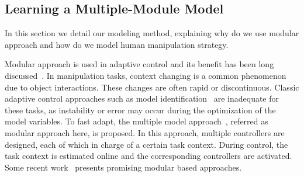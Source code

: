 \subsection{Learning a Multiple-Module Model}
\label{cha4:sec2:learn}
In this section we detail our modeling method, explaining why do we use modular approach and how do we model human manipulation strategy.


Modular approach is used in adaptive control and its benefit has been long discussed~\cite{jacobs1991adaptive,narendra1997adaptive}.
In manipulation tasks, context changing is a common phenomenon due to object interactions. These changes are often rapid or discontinuous. Classic adaptive control approaches such as model identification~\cite{khalil2004modeling} are inadequate for these tasks, as instability or error may occur during the optimization of the model variables. To fast adapt, the multiple model approach~\cite{narendra1995adaptation}, referred as modular approach here, is proposed. In this approach, multiple controllers are designed, each of which in charge of a certain task context. During control, the task context is estimated online and the corresponding controllers are activated.  Some recent work~\cite{fekri2007robust,kuipers2010multiple,sugimoto2012emosaic} presents promising modular based approaches.



